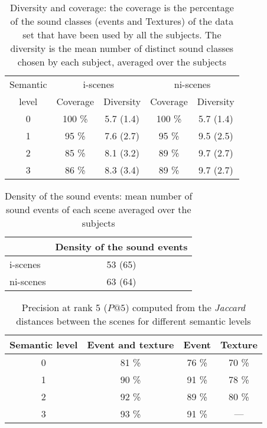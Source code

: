 \documentclass[12pt, titlepage, reqno]{article} %
\begin{document}
\newpage
\begin{table}[h]
 \caption{\label{Diversity} Diversity and coverage: the coverage is the percentage of the sound classes (events and Textures) of the data set that have been used by all the subjects. The diversity is the mean number of distinct sound classes chosen by each subject, averaged over the subjects}
\begin{tabular}{c  c c c c} 
    Semantic  & \multicolumn{2}{c}{i-scenes} & \multicolumn{2}{c}{ni-scenes} \\
     level& Coverage & Diversity & Coverage & Diversity \\
     \hline
    0    & 100 \% & 5.7 (1.4) & 100 \% & 5.7 (1.4) \\
    1    & 95  \% & 7.6 (2.7) & 95  \% & 9.5 (2.5) \\
    2    & 85  \% & 8.1 (3.2) & 89  \% & 9.7 (2.7) \\
    3    & 86  \% & 8.3 (3.4) & 89  \% & 9.7 (2.7) \\
    \hline
\end{tabular}
\end{table}

\newpage
\begin{table}[h]
\caption{\label{density} Density of the sound events: mean number of sound events of each scene averaged over the subjects}
\begin{tabular}{l c} 
          & Density of the sound events \\
    \hline
	i-scenes & 53 (65) \\
    ni-scenes & 63 (64) \\
    \hline
\end{tabular}
\end{table}

\newpage
\begin{table}[h]
\caption{\label{jaccardtable} Precision at rank 5 ($P@5$) computed from the \textit{Jaccard} distances between the scenes for different semantic levels}
\begin{tabular}{c c c c} 
Semantic level & Event and texture & Event & Texture \\
\hline
0  & 81 \%    & 76 \%   & 70 \%    \\
1  & 90 \%    & 91 \%   & 78 \%  \\
2  & 92 \% & 89 \% & 80 \% \\
3  & 93 \% & 91 \% & ---     \\

  \hline
\end{tabular}
\end{table}
\end{document}

